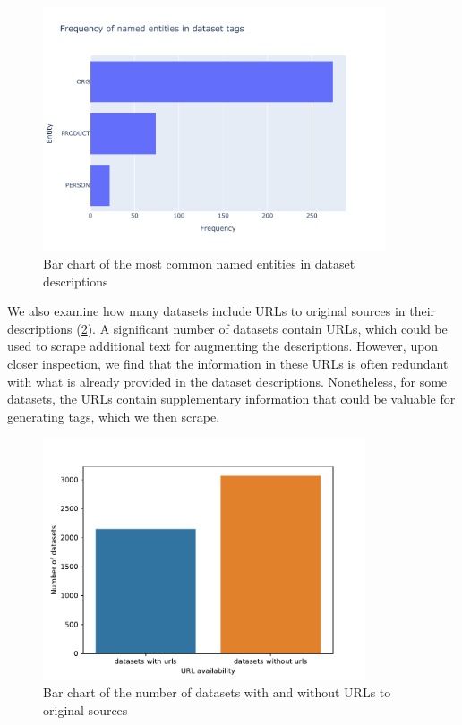 \begin{figure}[h]
    \centering
    \includegraphics[width=0.9\textwidth]{figures/ner.pdf}
    \caption{Bar chart of the most common named entities in dataset descriptions}
    \label{fig:ner}
\end{figure}

We also examine how many datasets include URLs to original sources in their descriptions (\cref{fig:url_availability}). A significant number of datasets contain URLs, which could be used to scrape additional text for augmenting the descriptions. However, upon closer inspection, we find that the information in these URLs is often redundant with what is already provided in the dataset descriptions. Nonetheless, for some datasets, the URLs contain supplementary information that could be valuable for generating tags, which we then scrape.

\begin{figure}[h]
    \centering
    \includegraphics[width=0.85\textwidth]{figures/url_availability.pdf}
    \caption{Bar chart of the number of datasets with and without URLs to original sources}
    \label{fig:url_availability}
\end{figure}

